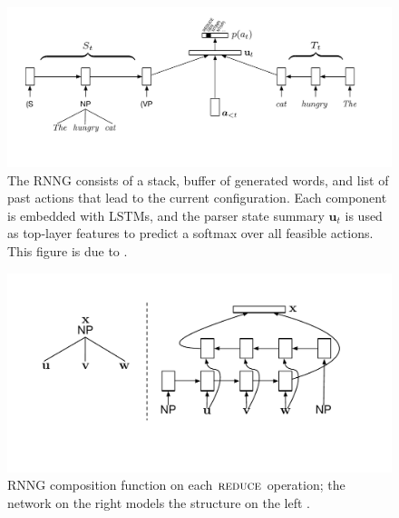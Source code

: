 \documentclass[11pt]{article}
\begin{document}
\begin{figure}
\centering
\vspace{-.2cm}\includegraphics[scale=.3]{genstate.pdf}
\vspace{-.7cm}\caption{The RNNG consists of a stack, buffer of generated words, and list of past actions that lead to the current configuration. Each component is embedded with LSTMs, and the parser state summary $\mathbf{u}_t$ is used as top-layer features to predict a softmax over all feasible actions. This figure is due to .
\label{fig:genstate}}
\end{figure}

\begin{figure}[h]
\centering
\includegraphics[scale=.45]{composition.pdf}
\vspace{-1.3cm}
\caption{RNNG composition function on each $\textsc{reduce}$ operation; the network on the right models the structure on the left \cite{rnng}.}
\label{fig:composition}
\end{figure}
\end{document}
